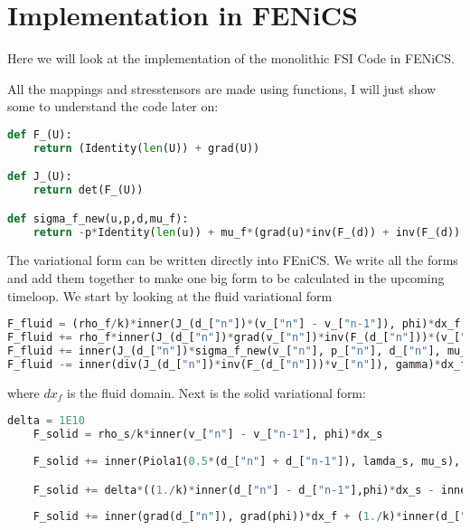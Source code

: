 \chapter{Implementation in FENiCS}
Here we will look at the implementation of the monolithic FSI Code in FENiCS. 





All the mappings and stresstensors are made using functions, I will just show some to understand the code later on:

\begin{lstlisting}[language=Python]
def F_(U):
	return (Identity(len(U)) + grad(U))

def J_(U):
	return det(F_(U))

def sigma_f_new(u,p,d,mu_f):
	return -p*Identity(len(u)) + mu_f*(grad(u)*inv(F_(d)) + inv(F_(d)).T*grad(u).T)

\end{lstlisting}

The variational form can be written directly into FEniCS. We write all the forms and add them together to make one big form to be calculated in the upcoming timeloop. We start by looking at the fluid variational form
\begin{lstlisting}[language=Python]
F_fluid = (rho_f/k)*inner(J_(d_["n"])*(v_["n"] - v_["n-1"]), phi)*dx_f
F_fluid += rho_f*inner(J_(d_["n"])*grad(v_["n"])*inv(F_(d_["n"]))*(v_["n"] - (d_["n"]-d_["n-1"])/k), phi)*dx_f
F_fluid += inner(J_(d_["n"])*sigma_f_new(v_["n"], p_["n"], d_["n"], mu_f)*inv(F_(d_["n"])).T, grad(phi))*dx_f
F_fluid -= inner(div(J_(d_["n"])*inv(F_(d_["n"]))*v_["n"]), gamma)*dx_f
\end{lstlisting}

where $dx_f$ is the fluid domain.
Next is the solid variational form:
\begin{lstlisting}[language=Python]
delta = 1E10
	F_solid = rho_s/k*inner(v_["n"] - v_["n-1"], phi)*dx_s
	
	F_solid += inner(Piola1(0.5*(d_["n"] + d_["n-1"]), lamda_s, mu_s), grad(phi))*dx_s

	F_solid += delta*((1./k)*inner(d_["n"] - d_["n-1"],phi)*dx_s - inner(0.5*(v_["n"] + v_["n-1"]), psi)*dx_s)
	
	F_solid += inner(grad(d_["n"]), grad(phi))*dx_f + (1./k)*inner(d_["n"] - d_["n-1"], psi)*dx_f
\end{lstlisting}

